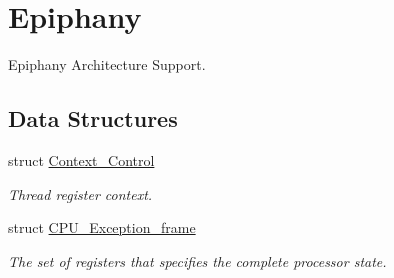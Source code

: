 \hypertarget{group__RTEMSScoreCPUEpiphany}{}\section{Epiphany}
\label{group__RTEMSScoreCPUEpiphany}


Epiphany Architecture Support.  


\subsection*{Data Structures}
\begin{DoxyCompactItemize}
\item 
struct \mbox{\hyperlink{structContext__Control}{Context\+\_\+\+Control}}
\begin{DoxyCompactList}\small\item\em Thread register context. \end{DoxyCompactList}\item 
struct \mbox{\hyperlink{structCPU__Exception__frame}{C\+P\+U\+\_\+\+Exception\+\_\+frame}}
\begin{DoxyCompactList}\small\item\em The set of registers that specifies the complete processor state. \end{DoxyCompactList}\end{DoxyCompactItemize}
